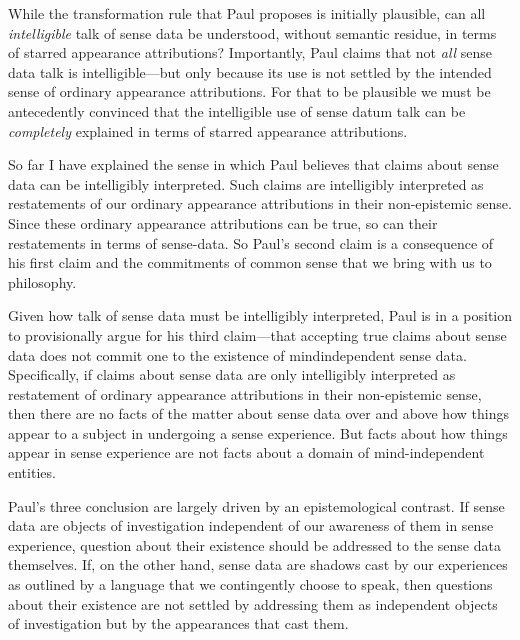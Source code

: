 \documentclass[11pt]{article}
\begin{document}
\begin{discussion}
    While the transformation rule that Paul proposes is initially plausible, can all \emph{intelligible} talk of sense data be understood, without semantic residue, in terms of starred appearance attributions? Importantly, Paul claims that not \emph{all} sense data talk is intelligible---but only because its use is not settled by the intended sense of ordinary appearance attributions. For that to be plausible we must be antecedently convinced that the intelligible use of sense datum talk can be \emph{completely} explained in terms of starred appearance attributions.
\end{discussion}

So far I have explained the sense in which Paul believes that claims about sense data can be intelligibly interpreted. Such claims are intelligibly interpreted as restatements of our ordinary appearance attributions in their non-epistemic sense. Since these ordinary appearance attributions can be true, so can their restatements in terms of sense-data. So Paul's second claim is a consequence of his first claim and the commitments of common sense that we bring with us to philosophy.

Given how talk of sense data must be intelligibly interpreted, Paul is in a position to provisionally argue for his third claim---that accepting true claims about sense data does not commit one to the existence of mind\-in\-de\-pen\-dent sense data. Specifically, if claims about sense data are only intelligibly interpreted as restatement of ordinary appearance attributions in their non-epistemic sense, then there are no facts of the matter about sense data over and above how things appear to a subject in undergoing a sense experience. But facts about how things appear in sense experience are not facts about a domain of mind-\-independent entities. 

Paul's three conclusion are largely driven by an epistemological contrast. If sense data are objects of investigation independent of our awareness of them in sense experience, question about their existence should be addressed to the sense data themselves. If, on the other hand, sense data are shadows cast by our experiences as outlined by a language that we contingently choose to speak, then questions about their existence are not settled by addressing them as independent objects of investigation but by the appearances that cast them.
\end{document}
